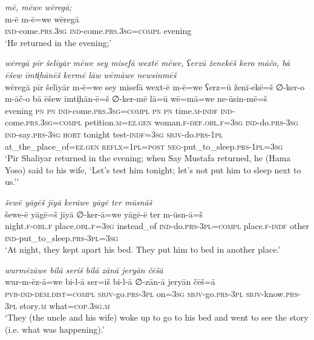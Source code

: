 \ea \label{ŽP.61}
\textit{mē, mēwe wēregā;} \\ 
\gll m-ē m-ē=we wēregā \\ 
 \textsc{ind-}come\textsc{.prs}\textsc{.3sg} \textsc{ind-}come\textsc{.prs}\textsc{.3sg}\textsc{=compl} evening \\ 
\glt `He returned in the evening;'
\z 
 
\ea \label{ŽP.62}
\textit{wēregā pīr šelīyār mēwe sey misefā wextē mēwe, ʕerzū ženekēš kero māčo, bā ēšew īmti̩hānēš kermē lāw wēmāwe newsinmēš} \\ 
\gll wēregā pīr šelīyār m-ē=we sey misefā wext-ē m-ē=we ʕerz=ū ženī-ekē=š ∅-ker-o m-āč-o bā ēšew īmti̩hān-ē=š ∅-ker-mē lā=ū wē=mā=we ne-ūsin-mē=š \\ 
 evening \textsc{pn} \textsc{pn} \textsc{ind-}come\textsc{.prs}\textsc{.3sg}\textsc{=compl} \textsc{pn} \textsc{pn} time\textsc{.m}\textsc{-indf} \textsc{ind-}come\textsc{.prs}\textsc{.3sg}\textsc{=compl} petition\textsc{.m}\textsc{\textsc{=ez.gen}} woman\textsc{.f}\textsc{-def}\textsc{.obl}\textsc{.f}\textsc{=3sg} \textsc{ind-}do\textsc{.prs}\textsc{-3sg} \textsc{ind-}say\textsc{.prs}\textsc{-3sg} \textsc{hort} tonight test\textsc{-indf}\textsc{=3sg} \textsc{sbjv-}do\textsc{.prs}\textsc{-1pl} at\_the\_place\_of\textsc{\textsc{=ez.gen}} \textsc{reflx}\textsc{=1pl}\textsc{=\textsc{post}} \textsc{neg-}put\_to\_sleep\textsc{.prs}\textsc{-1pl}\textsc{=3sg} \\ 
\glt `Pir Shaliyar returned in the evening; when Say Mustafa returned, he (Hama Yoso) said to his wife, ‘Let’s test him tonight; let’s not put him to sleep next to us.’'
\z 
 
\ea \label{ŽP.65}
\textit{šewē yāgēš jīyā kerāwe yāgē ter mūsnāš} \\ 
\gll šewe-ē yāgē=š jīyā ∅-ker-ā=we yāgē-ē ter m-ūsn-ā=š \\ 
 night\textsc{.f}\textsc{-obl}\textsc{.f} place\textsc{.obl}\textsc{.f}\textsc{=3sg} instead\_of \textsc{ind-}do\textsc{.prs}\textsc{-3pl}\textsc{=compl} place\textsc{.f}\textsc{-indf} other \textsc{ind-}put\_to\_sleep\textsc{.prs}\textsc{-3pl}\textsc{=3sg} \\ 
\glt `At night, they kept apart his bed. They put him to bed in another place.'
\z 
 
\ea \label{ŽP.67}
\textit{wurmēzāwe bilā seriš bilā zānā jeryān čēšā} \\ 
\gll wur-m-ēz-ā=we bi-l-ā ser=iš bi-l-ā ∅-zān-ā jeryān čēš=ā \\ 
 \textsc{pvb-}\textsc{ind-}\textsc{dem.dist}\textsc{=compl} \textsc{sbjv-}go\textsc{.prs}\textsc{-3pl} on\textsc{=3sg} \textsc{sbjv-}go\textsc{.prs}\textsc{-3pl} \textsc{sbjv-}know\textsc{.prs}\textsc{-3pl} story\textsc{.m} what\textsc{=cop}\textsc{.3sg}\textsc{.m} \\ 
\glt `They (the uncle and his wife) woke up to go to his bed and went to see the story (i.e. what was happening).'
\z 
 
